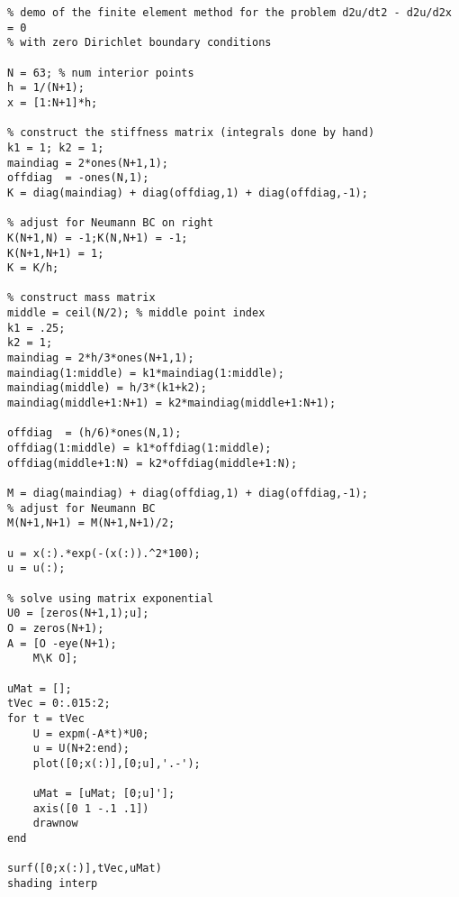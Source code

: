 {\footnotesize
\begin{verbatim}
% demo of the finite element method for the problem d2u/dt2 - d2u/d2x = 0
% with zero Dirichlet boundary conditions

N = 63; % num interior points
h = 1/(N+1);
x = [1:N+1]*h;

% construct the stiffness matrix (integrals done by hand)
k1 = 1; k2 = 1;
maindiag = 2*ones(N+1,1);
offdiag  = -ones(N,1);
K = diag(maindiag) + diag(offdiag,1) + diag(offdiag,-1);

% adjust for Neumann BC on right
K(N+1,N) = -1;K(N,N+1) = -1;
K(N+1,N+1) = 1;
K = K/h;

% construct mass matrix
middle = ceil(N/2); % middle point index
k1 = .25;
k2 = 1;
maindiag = 2*h/3*ones(N+1,1);
maindiag(1:middle) = k1*maindiag(1:middle);
maindiag(middle) = h/3*(k1+k2);
maindiag(middle+1:N+1) = k2*maindiag(middle+1:N+1);

offdiag  = (h/6)*ones(N,1);
offdiag(1:middle) = k1*offdiag(1:middle);
offdiag(middle+1:N) = k2*offdiag(middle+1:N);

M = diag(maindiag) + diag(offdiag,1) + diag(offdiag,-1);
% adjust for Neumann BC
M(N+1,N+1) = M(N+1,N+1)/2;

u = x(:).*exp(-(x(:)).^2*100);
u = u(:);

% solve using matrix exponential
U0 = [zeros(N+1,1);u];
O = zeros(N+1);
A = [O -eye(N+1);
    M\K O];

uMat = [];
tVec = 0:.015:2;
for t = tVec
    U = expm(-A*t)*U0;
    u = U(N+2:end);
    plot([0;x(:)],[0;u],'.-');
    
    uMat = [uMat; [0;u]'];
    axis([0 1 -.1 .1])
    drawnow
end

surf([0;x(:)],tVec,uMat)
shading interp
\end{verbatim}}
